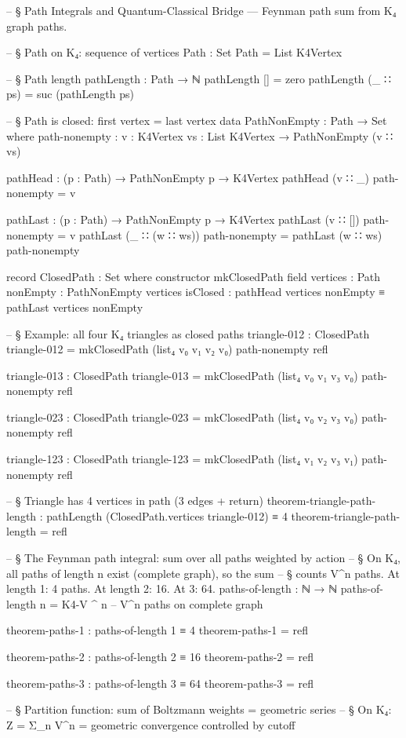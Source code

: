 \documentclass[11pt,a4paper]{book}
\begin{document}
\begin{code}
-- § Path Integrals and Quantum-Classical Bridge — Feynman path sum from K₄ graph paths.

-- § Path on K₄: sequence of vertices
Path : Set
Path = List K4Vertex

-- § Path length
pathLength : Path → ℕ
pathLength [] = zero
pathLength (_ ∷ ps) = suc (pathLength ps)

-- § Path is closed: first vertex = last vertex
data PathNonEmpty : Path → Set where
  path-nonempty : {v : K4Vertex} {vs : List K4Vertex} → PathNonEmpty (v ∷ vs)

pathHead : (p : Path) → PathNonEmpty p → K4Vertex
pathHead (v ∷ _) path-nonempty = v

pathLast : (p : Path) → PathNonEmpty p → K4Vertex
pathLast (v ∷ []) path-nonempty = v
pathLast (_ ∷ (w ∷ ws)) path-nonempty = pathLast (w ∷ ws) path-nonempty

record ClosedPath : Set where
  constructor mkClosedPath
  field
    vertices  : Path
    nonEmpty  : PathNonEmpty vertices
    isClosed  : pathHead vertices nonEmpty ≡ pathLast vertices nonEmpty

-- § Example: all four K₄ triangles as closed paths
triangle-012 : ClosedPath
triangle-012 = mkClosedPath (list₄ v₀ v₁ v₂ v₀) path-nonempty refl

triangle-013 : ClosedPath
triangle-013 = mkClosedPath (list₄ v₀ v₁ v₃ v₀) path-nonempty refl

triangle-023 : ClosedPath
triangle-023 = mkClosedPath (list₄ v₀ v₂ v₃ v₀) path-nonempty refl

triangle-123 : ClosedPath
triangle-123 = mkClosedPath (list₄ v₁ v₂ v₃ v₁) path-nonempty refl

-- § Triangle has 4 vertices in path (3 edges + return)
theorem-triangle-path-length : pathLength (ClosedPath.vertices triangle-012) ≡ 4
theorem-triangle-path-length = refl

-- § The Feynman path integral: sum over all paths weighted by action
-- § On K₄, all paths of length n exist (complete graph), so the sum
-- § counts V^n paths. At length 1: 4 paths. At length 2: 16. At 3: 64.
paths-of-length : ℕ → ℕ
paths-of-length n = K4-V ^ n  -- V^n paths on complete graph

theorem-paths-1 : paths-of-length 1 ≡ 4
theorem-paths-1 = refl

theorem-paths-2 : paths-of-length 2 ≡ 16
theorem-paths-2 = refl

theorem-paths-3 : paths-of-length 3 ≡ 64
theorem-paths-3 = refl

-- § Partition function: sum of Boltzmann weights = geometric series
-- § On K₄: Z = Σ_n V^n = geometric convergence controlled by cutoff
\end{code}
\end{document}
